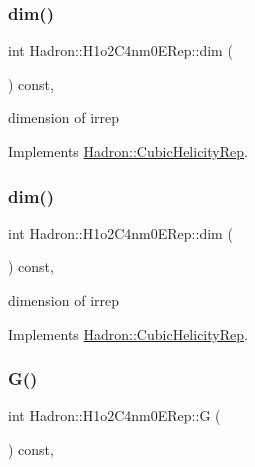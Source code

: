 \subsubsection{\texorpdfstring{dim()}{dim()}\hspace{0.1cm}{\footnotesize\ttfamily [1/2]}}
{\footnotesize\ttfamily int Hadron\+::\+H1o2\+C4nm0\+E\+Rep\+::dim (\begin{DoxyParamCaption}{ }\end{DoxyParamCaption}) const\hspace{0.3cm}{\ttfamily [inline]}, {\ttfamily [virtual]}}

dimension of irrep 

Implements \mbox{\hyperlink{structHadron_1_1CubicHelicityRep_a95d229a05580e65f8bdde74a1e316855}{Hadron\+::\+Cubic\+Helicity\+Rep}}.

\mbox{\label{structHadron_1_1H1o2C4nm0ERep_a9c5abe37865ed4889e2411425733e664}} 
\subsubsection{\texorpdfstring{dim()}{dim()}\hspace{0.1cm}{\footnotesize\ttfamily [2/2]}}
{\footnotesize\ttfamily int Hadron\+::\+H1o2\+C4nm0\+E\+Rep\+::dim (\begin{DoxyParamCaption}{ }\end{DoxyParamCaption}) const\hspace{0.3cm}{\ttfamily [inline]}, {\ttfamily [virtual]}}

dimension of irrep 

Implements \mbox{\hyperlink{structHadron_1_1CubicHelicityRep_a95d229a05580e65f8bdde74a1e316855}{Hadron\+::\+Cubic\+Helicity\+Rep}}.

\mbox{\label{structHadron_1_1H1o2C4nm0ERep_a27d3efda696f16d6a2aa6ed3c3a9daf9}} 
\subsubsection{\texorpdfstring{G()}{G()}\hspace{0.1cm}{\footnotesize\ttfamily [1/2]}}
{\footnotesize\ttfamily int Hadron\+::\+H1o2\+C4nm0\+E\+Rep\+::G (\begin{DoxyParamCaption}{ }\end{DoxyParamCaption}) const\hspace{0.3cm}{\ttfamily [inline]}, {\ttfamily [virtual]}}

